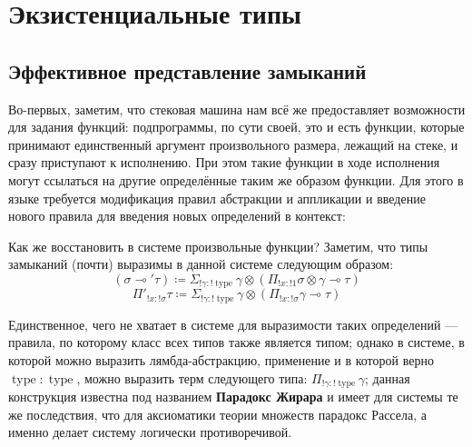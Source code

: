 \documentclass[12pt]{article}
\DeclareMathOperator{\bnd}{\|}
\DeclareMathOperator{\inn}{in}
\DeclareMathOperator{\lett}{let}
\DeclareMathOperator{\type}{type}
\newcommand{\letin}[3]{\lett\,#1=#2\,\inn\,#3}
\begin{document}
\section{Экзистенциальные типы}

\subsection{Эффективное представление замыканий}

Во-первых, заметим, что стековая машина нам всё же предоставляет возможности для
задания функций: подпрограммы, по сути своей, это и есть функции, которые
принимают единственный аргумент произвольного размера, лежащий на стеке, и сразу
приступают к исполнению. При этом такие функции в ходе исполнения могут
ссылаться на другие определённые таким же образом функции. Для этого в языке
требуется модификация правил абстракции и аппликации и введение нового правила
для введения новых определений в контекст:

Как же восстановить в системе произвольные функции? Заметим, что типы
замыканий (почти) выразимы в данной системе следующим образом:
\[
  (\sigma\multimap'\tau)\coloneq
  \Sigma_{!\gamma:!\type}\gamma\otimes
    (\Pi_{!x:!1}\sigma\otimes\gamma\multimap\tau)
\]
\[
  \Pi'_{!x:!\sigma}\tau\coloneq
  \Sigma_{!\gamma:!\type}\gamma\otimes(\Pi_{!x:!\sigma}\gamma\multimap\tau)
\]

Единственное, чего не хватает в системе для выразимости таких определений ---
правила, по которому класс всех типов также является типом; однако в системе,
в которой можно выразить лямбда-абстракцию, применение и в которой верно
$\type:\type$, можно выразить терм следующего типа:
$\Pi_{!\gamma:!\type}\gamma$; данная конструкция известна под названием
\textbf{Парадокс Жирара} \cite{girard} и имеет для системы те же последствия,
что для аксиоматики теории множеств парадокс Рассела, а именно делает систему
логически противоречивой.
\end{document}
